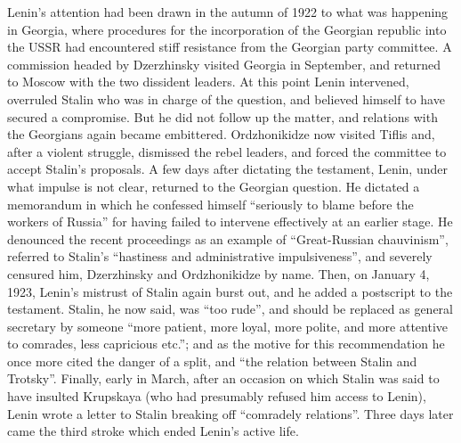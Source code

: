 Lenin's attention had been drawn in the autumn of 1922 to what was happening in Georgia, where procedures for the incorporation of the Georgian republic into the USSR had encountered stiff resistance from the Georgian party committee. A commission headed by Dzerzhinsky visited Georgia in September, and returned to Moscow with the two dissident leaders. At this point Lenin intervened, overruled Stalin who was in charge of the question, and believed himself to have secured a compromise. But he did not follow up the matter, and relations with the Georgians again became embittered. Ordzhonikidze now visited Tiflis and, after a violent struggle, dismissed the rebel leaders, and forced the committee to accept Stalin's proposals. A few days after dictating the testament, Lenin, under what impulse is not clear, returned to the Georgian question. He dictated a memorandum in which he confessed himself ``seriously to blame before the workers of Russia'' for having failed to intervene effectively at an earlier stage. He denounced the recent proceedings as an example of ``Great-Russian chauvinism'', referred to Stalin's ``hastiness and administrative impulsiveness'', and severely censured him, Dzerzhinsky and Ordzhonikidze by name. Then, on January 4, 1923, Lenin's mistrust of Stalin again burst out, and he added a postscript to the testament. Stalin, he now said, was ``too rude'', and should be replaced as general secretary by someone ``more patient, more loyal, more polite, and more attentive to comrades, less capricious etc.''; and as the motive for this recommendation he once more cited the danger of a split, and ``the relation between Stalin and Trotsky''. Finally, early in March, after an occasion on which Stalin was said to have insulted Krupskaya (who had presumably refused him access to Lenin), Lenin wrote a letter to Stalin breaking off ``comradely relations''. Three days later came the third stroke which ended Lenin's active life. 

